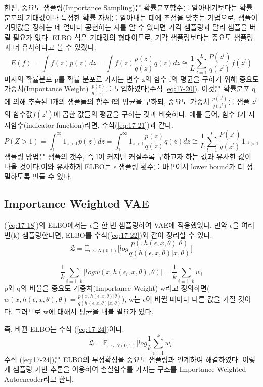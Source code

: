 \documentclass[draft=false]{oblivoir}
\begin{document}
한편, 중요도 샘플링(Importance Sampling)은 확률분포함수를 알아내기보다는 확률분포의 기대값이나 특정한 확률 자체를 알아내는 데에 초점을 맞추는 기법으로, 샘플이 기댓값을 정하는 데 얼마나 공헌하는 지를 알 수 있다면 기각 샘플링과 달리 샘플을 버릴 필요가 없다. ELBO 식은  기대값의 형태이므로, 기각 샘플링보다는 중요도 샘플링과 더 유사하다고 볼 수 있겠다.
\begin{equation}
	E(f) = \int f(z)p(z)dz = \int f(z)\frac {p(z)}{q(z)}q(z)dz \cong \frac{1}{L} \sum_{l=1}^L \frac{P(z^l)}{q(z^l)}f(z^l)
	\label{eq:17-20}
\end{equation}
미지의 확률분포 p를 확률 분포로 가지는 변수 z의 함수 f의 평균을 구하기 위해 중요도 가중치(Importance Weight) $\frac{p(z)}{q(z)}$를 도입하였다(수식 \ref{eq:17-20}). 이것은 확률분포 q에 의해 추출된 l개의 샘플들의 함수 f의 평균을 구하되, 중요도 가중치 $\frac{p(z^l)}{q(z^l)}$를 샘플 $z^l$의 함수값$f(z^l)$에 곱한 값들의 평균을 구하는 것과 비슷하다. 예를 들어, 함수 f가 지시함수(indicator function)라면, 수식(\ref{eq:17-21})과 같다.
\begin{equation}
	P(Z>1) = \int_{1}^{\infty}1_{z>1}p(z)dz = \int_{1}^{\infty}1_{z>1}\frac {p(z)}{q(z)}q(z)dz \cong \frac{1}{L} \sum_{l=1}^L \frac{P(z^l)}{q(z^l)} 1_{z^1>1}
	\label{eq:17-21}
\end{equation}
샘플링 방법은 샘플의 갯수, 즉 l이 커지면 커질수록 구하고자 하는 값과 유사한 값이 나올 것이다.이와 유사하게 ELBO는 $\epsilon$ 샘플링 횟수를 바꾸어서 lower bound가 더 정밀하도록 만들 수 있다.

\subsection{Importance Weighted VAE}
(\ref{eq:17-18})의 ELBO에서는 $\epsilon$을 한 번 샘플링하여 VAE에 적용했었다. 만약 $\epsilon$을 여러 번(k) 샘플링한다면, ELBO를 수식(\ref{eq:17-22})와 같이 정리할 수 있다.
\begin{equation}
	\mathfrak{L} = \mathbb{E}_{\epsilon \sim N(0,1)} \Big[ log \frac{p(,h(\epsilon,x,\theta)|\theta)}{q(h(\epsilon,x,\theta)|x,\theta)} \Big]
	\label{eq:17-22}
\end{equation}

\begin{equation}
	\frac{1}{k} \sum_{i=1..k} \Big[ logw(x,h(\epsilon_i,x,\theta),\theta) \Big] = \frac{1}{k} \sum_{i=1..k} w_i
	\label{eq:17-23}
\end{equation}
p와 q의 비율을 중요도 가중치(Importance Weight) w라고 정의하면($w(x,h(\epsilon,x,\theta),\theta) = \frac{p(x,h(\epsilon,x,\theta)|\theta)}{q(h(\epsilon,x,\theta)|x,\theta)}$), w는 $\epsilon$이 바뀔 때마다 다른 값을 가질 것이다. 그러므로 w에 대해서 평균을 내볼 필요가 있다.

즉, 바뀐 ELBO는 수식 (\ref{eq:17-24})이다.
\begin{equation}
	\mathfrak{L} = \mathbb{E}_{\epsilon \sim N(0,1)} \Big[log\frac{1}{k}\sum_{i=1}^k w_i \Big]
	\label{eq:17-24}
\end{equation}
수식 (\ref{eq:17-24})은 ELBO의 부정확성을 중요도 샘플링과 연계하여 해결하였다. 이렇게 샘플링 기반 추론을 이용하여 손실함수를 가지는 구조를 Importance Weighted Autoencoder라고 한다.
\end{document}

